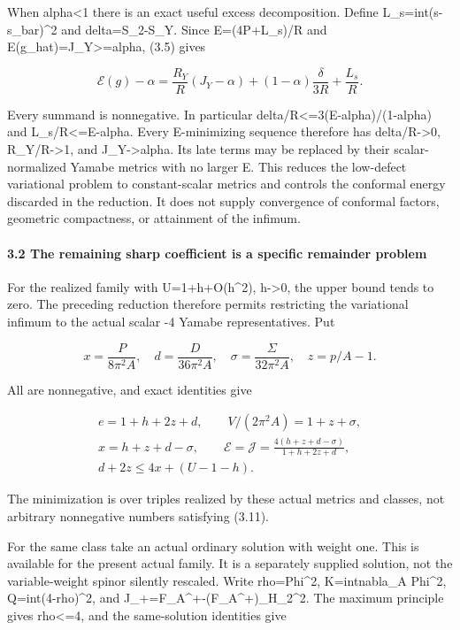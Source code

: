 \documentclass[
  10pt,
]{article}
\begin{document}
When alpha\textless1 there is an exact useful excess decomposition.
Define L\_s=int(s-s\_bar)\^{}2 and delta=S\_2-S\_Y. Since E=(4P+L\_s)/R
and E(g\_hat)=J\_Y\textgreater=alpha, (3.5) gives

\[
 \boxed{\mathcal E(g)-\alpha=
   \frac{R_Y}{R}(J_Y-\alpha)
   +(1-\alpha)\frac{\delta}{3R}+\frac{L_s}{R}.}          \tag{3.10}
\]

Every summand is nonnegative. In particular
delta/R\textless=3(E-alpha)/(1-alpha) and L\_s/R\textless=E-alpha. Every
E-minimizing sequence therefore has delta/R-\textgreater0,
R\_Y/R-\textgreater1, and J\_Y-\textgreater alpha. Its late terms may be
replaced by their scalar-normalized Yamabe metrics with no larger E.
This reduces the low-defect variational problem to constant-scalar
metrics and controls the conformal energy discarded in the reduction. It
does not supply convergence of conformal factors, geometric compactness,
or attainment of the infimum.

\hypertarget{the-remaining-sharp-coefficient-is-a-specific-remainder-problem}{%
\paragraph{3.2 The remaining sharp coefficient is a specific remainder
problem}\label{the-remaining-sharp-coefficient-is-a-specific-remainder-problem}}

For the realized family with U=1+h+O(h\^{}2), h-\textgreater0, the upper
bound tends to zero. The preceding reduction therefore permits
restricting the variational infimum to the actual scalar -4 Yamabe
representatives. Put

\[
 x=\frac{P}{8\pi^2A},\quad d=\frac{D}{36\pi^2A},\quad
 \sigma=\frac{\Sigma}{32\pi^2A},\quad z=p/A-1.
\]

All are nonnegative, and exact identities give

\[
\begin{gathered}
 e=1+h+2z+d,\qquad V/(2\pi^2 A)=1+z+\sigma,\\
 x=h+z+d-\sigma,\qquad
 \mathcal E=\mathcal J=\frac{4(h+z+d-\sigma)}{1+h+2z+d},\\
                 d+2z\le4x+(U-1-h).
\end{gathered}                                                     \tag{3.11}
\]

The minimization is over triples realized by these actual metrics and
classes, not arbitrary nonnegative numbers satisfying (3.11).

For the same class take an actual ordinary solution with weight one.
This is available for the present actual family. It is a separately
supplied solution, not the variable-weight spinor silently rescaled.
Write rho=\textbar Phi\textbar\^{}2, K=int\textbar nabla\_A
Phi\textbar\^{}2, Q=int(4-rho)\^{}2, and
J\_+=\textbar\textbar F\_A\^{}+-(F\_A\^{}+)\_H\textbar\textbar\_2\^{}2.
The maximum principle gives rho\textless=4, and the same-solution
identities give
\end{document}
